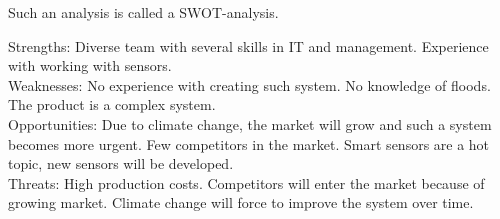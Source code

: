 Such an analysis is called a SWOT-analysis. 

Strengths: Diverse team with several skills in IT and management. Experience with working with sensors.\\ 
Weaknesses: No experience with creating such system. No knowledge of floods. The product is a complex system.\\
Opportunities: Due to climate change, the market will grow and such a system becomes more urgent. Few competitors in the market. Smart sensors are a hot topic, new sensors will be developed.\\
Threats: High production costs. Competitors will enter the market because of growing market. Climate change will force to improve the system over time.\\

%
%
%

